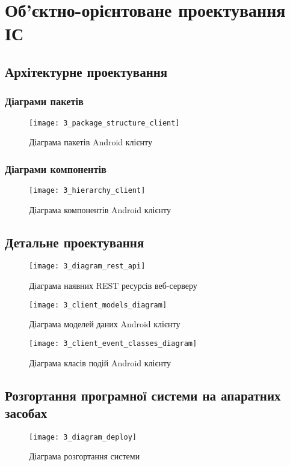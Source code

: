 \documentclass[../main.tex]{subfiles}
\begin{document}
\chapter{Об’єктно-орієнтоване проектування ІС}

\section{Архітектурне проектування}

\subsection{Діаграми пакетів}


\begin{figure}[H]
	\centering
	\texttt{[image: 3\_package\_structure\_client]}
	\caption{Діаграма пакетів Android клієнту}
\end{figure}

\subsection{Діаграми компонентів}


\begin{figure}[H]
	\centering
	\texttt{[image: 3\_hierarchy\_client]}
	\caption{Діаграма компонентів Android клієнту}
\end{figure}

\section{Детальне проектування}

\begin{figure}[H]
	\centering
	\texttt{[image: 3\_diagram\_rest\_api]}
	\caption{Діаграма наявних REST ресурсів веб-серверу}
\end{figure}

\begin{figure}[H]
	\centering
	\texttt{[image: 3\_client\_models\_diagram]}
	\caption{Діаграма моделей даних Android клієнту}
\end{figure}

\begin{figure}[H]
	\centering
	\texttt{[image: 3\_client\_event\_classes\_diagram]}
	\caption{Діаграма класів подій Android клієнту}
\end{figure}

\section{Розгортання програмної системи на апаратних засобах}

\begin{figure}[H]
	\centering
	\texttt{[image: 3\_diagram\_deploy]}
	\caption{Діаграма розгортання системи}
\end{figure}
\end{document}
